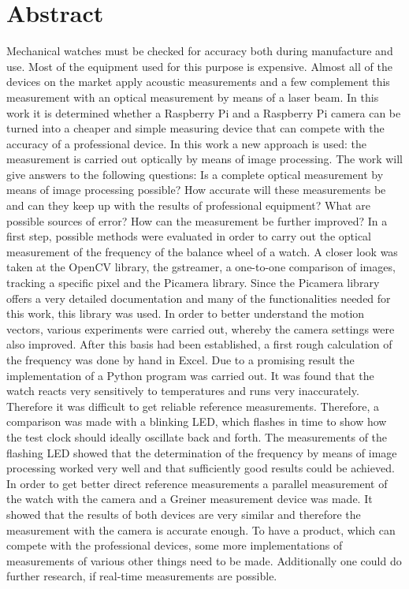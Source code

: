 \documentclass[12pt, a4paper]{report}
\begin{document}
\chapter*{Abstract}
Mechanical watches must be checked for accuracy both during manufacture and use. Most of the equipment used for this purpose is expensive. Almost all of the devices on the market apply acoustic measurements and a few complement this measurement with an optical measurement by means of a laser beam. In this work it is determined whether a Raspberry Pi and a Raspberry Pi camera can be turned into a cheaper and simple measuring device that can compete with the accuracy of a professional device. In this work a new approach is used: the measurement is carried out optically by means of image processing. 
\newline
The work will give answers to the following questions: Is a complete optical measurement by means of image processing possible? How accurate will these measurements be and can they keep up with the results of professional equipment? What are possible sources of error? How can the measurement be further improved? 
\newline
In a first step, possible methods were evaluated in order to carry out the optical measurement of the frequency of the balance wheel of a watch. A closer look was taken at the OpenCV library, the gstreamer, a one-to-one comparison of images, tracking a specific pixel and the Picamera library. Since the Picamera library offers a very detailed documentation and many of the functionalities needed for this work, this library was used. In order to better understand the motion vectors, various experiments were carried out, whereby the camera settings were also improved. After this basis had been established, a first rough calculation of the frequency was done by hand in Excel. Due to a promising result the implementation of a Python program was carried out. It was found that the watch reacts very sensitively to temperatures and runs very inaccurately. Therefore it was difficult to get reliable reference measurements. Therefore, a comparison was made with a blinking LED, which flashes in time to show how the test clock should ideally oscillate back and forth. The measurements of the flashing LED showed that the determination of the frequency by means of image processing worked very well and that sufficiently good results could be achieved. In order to get better direct reference measurements a parallel measurement of the watch with the camera and a Greiner measurement device was made. It showed that the results of both devices are very similar and therefore the measurement with the camera is accurate enough. To have a product, which can compete with the professional devices, some more implementations of measurements of various other things need to be made. Additionally one could do further research, if real-time measurements are possible.
\end{document}
